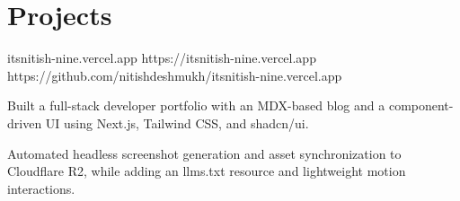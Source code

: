 




\section*{Projects}

\project
{itsnitish-nine.vercel.app}
{https://itsnitish-nine.vercel.app}
{https://github.com/nitishdeshmukh/itsnitish-nine.vercel.app}
{}
{
\item Built a full-stack developer portfolio with an MDX-based blog and a component-driven UI using Next.js, Tailwind CSS, and shadcn/ui.
\item Automated headless screenshot generation and asset synchronization to Cloudflare R2, while adding an llms.txt resource and lightweight motion interactions.
}

